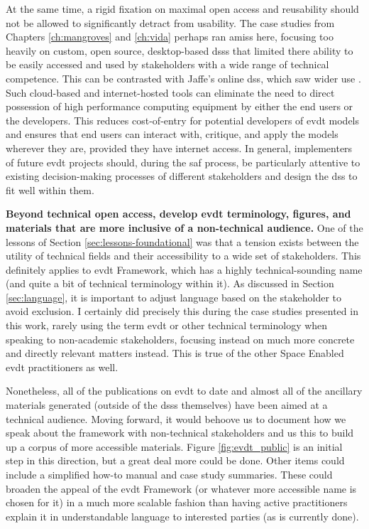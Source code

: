 At the same time, a rigid fixation on maximal open access and reusability should not be allowed to significantly detract from usability. The case studies from Chapters \ref{ch:mangroves} and \ref{ch:vida} perhaps ran amiss here, focusing too heavily on custom, open source, desktop-based \acp{dss} that limited there ability to be easily accessed and used by stakeholders with a wide range of technical competence. This can be contrasted with Jaffe's online \ac{dss}, which saw wider use \cite{jaffeEnvironmentalEconomicSystems2022}. Such cloud-based and internet-hosted tools can eliminate the need to direct possession of high performance computing equipment by either the end users or the developers. This reduces cost-of-entry for potential developers of \ac{evdt} models and ensures that end users can interact with, critique, and apply the models wherever they are, provided they have internet access. In general, implementers of future \ac{evdt} projects should, during the \ac{saf} process, be particularly attentive to existing decision-making processes of different stakeholders and design the \ac{dss} to fit well within them.

\textbf{Beyond technical open access, develop \ac{evdt} terminology, figures, and materials that are more inclusive of a non-technical audience.} One of the lessons of Section \ref{sec:lessons-foundational} was that a tension exists between the utility of technical fields and their accessibility to a wide set of stakeholders. This definitely applies to \ac{evdt} Framework, which has a highly technical-sounding name (and quite a bit of technical terminology within it). As discussed in Section \ref{sec:language}, it is important to adjust language based on the stakeholder to avoid exclusion. I certainly did precisely this during the case studies presented in this work, rarely using the term \ac{evdt} or other technical terminology when speaking to non-academic stakeholders, focusing instead on much more concrete and directly relevant matters instead. This is true of the other Space Enabled \ac{evdt} practitioners as well. 

Nonetheless, all of the publications on \ac{evdt} to date and almost all of the ancillary materials generated (outside of the \acp{dss} themselves) have been aimed at a technical audience. Moving forward, it would behoove us to document how we speak about the framework with non-technical stakeholders and us this to build up a corpus of more accessible materials. Figure \ref{fig:evdt_public} is an initial step in this direction, but a great deal more could be done. Other items could include a simplified how-to manual and case study summaries. These could broaden the appeal of the \ac{evdt} Framework (or whatever more accessible name is chosen for it) in a much more scalable fashion than having active practitioners explain it in understandable language to interested parties (as is currently done).

